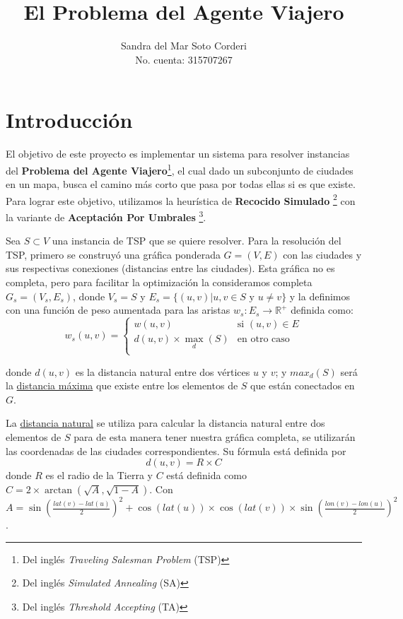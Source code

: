 \documentclass{article}
\title{El Problema del Agente Viajero}
\author{
  Sandra del Mar Soto Corderi\\
  No. cuenta: 315707267
}
\date{}
\begin{document}
\maketitle

\section{Introducción}

El objetivo de este proyecto es implementar un sistema para resolver instancias del \textbf{Problema del Agente Viajero}\footnote{Del inglés \textit{Traveling Salesman Problem} (TSP)}, el cual dado un subconjunto de ciudades en un mapa, busca el camino más corto que pasa por todas ellas si es que existe.
Para lograr este objetivo, utilizamos la heurística de \textbf{Recocido Simulado} \footnote{Del inglés \textit{Simulated Annealing} (SA)} con la variante de \textbf{Aceptación Por Umbrales} \footnote{Del inglés \textit{Threshold Accepting} (TA)}.

Sea $S \subset V$ una instancia de TSP que se quiere resolver.
Para la resolución del TSP, primero se construyó una gráfica ponderada $G=(V,E)$ con las ciudades y sus respectivas conexiones (distancias entre las ciudades).
Esta gráfica no es completa, pero para facilitar la optimización la consideramos completa $G_s =(V_s, E_s)$, donde $V_s = S$ y $E_s= \{ (u,v) | u,v \in S \text{ y } u \not= v \}$ y la definimos con una función de peso aumentada para las aristas $w_s : E_s \to \mathds{R}^+$ definida como:
\[
  w_s(u,v) =
    \begin{cases}
      w(u,v)                   & \text{si }(u,v) \in E\\
      d(u,v) \times \max_d (S) &\text{en otro caso}\\
    \end{cases}
\]

donde $d(u,v)$ es la distancia natural entre dos vértices $u$ y $v$; y $max_d (S)$ será la \underline{distancia máxima} que existe entre los elementos de $S$ que están conectados en $G$.

La \underline{distancia natural} se utiliza para calcular la distancia natural entre dos elementos
de $S$ para de esta manera tener nuestra gráfica completa, se utilizarán las coordenadas de las
ciudades correspondientes. Su fórmula está definida por
\[
    d(u,v) = R \times C
\]
donde $R$ es el radio de la Tierra y $C$ está definida como $C = 2 \times \arctan(\sqrt{A},\sqrt{1-A})$. Con $A = \sin(\frac{lat(v)-lat(u)}{2})^2 + \cos(lat(u)) \times \cos(lat(v)) \times \sin(\frac{lon(v)-lon(u)}{2})^2$.
\end{document}
